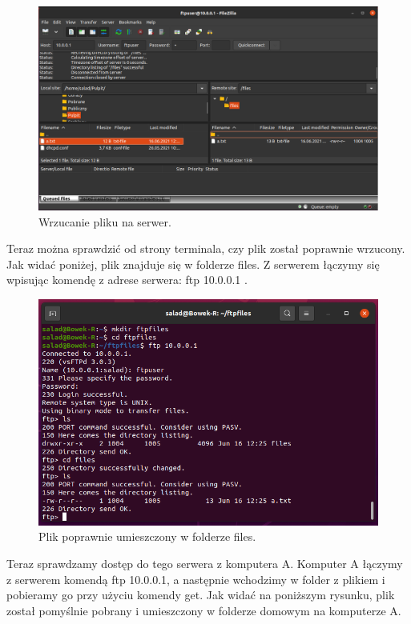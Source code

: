 \documentclass{article}
\begin{document}
\begin{figure}[H]
    \centering
    \includegraphics[scale = 0.45]{ftp/filezilla.png}  
    \caption{Wrzucanie pliku na serwer.}
    \label{5}
\end{figure}
Teraz można sprawdzić od strony terminala, czy plik został poprawnie wrzucony. Jak widać poniżej, plik znajduje się w folderze files. Z serwerem łączymy się wpisując komendę z adrese serwera: ftp 10.0.0.1 .
\newpage
\begin{figure}[H]
    \centering
    \includegraphics[totalheight=6cm]{ftp/logowanie_i_pliki.png}  
    \caption{Plik poprawnie umieszczony w folderze files.}
    \label{5}
\end{figure}

Teraz sprawdzamy dostęp do tego serwera z komputera A. Komputer A łączymy z serwerem komendą ftp 10.0.0.1, a następnie wchodzimy w folder z plikiem i pobieramy go przy użyciu komendy get. Jak widać na poniższym rysunku, plik został pomyślnie pobrany i umieszczony w folderze domowym na komputerze A.
\end{document}
